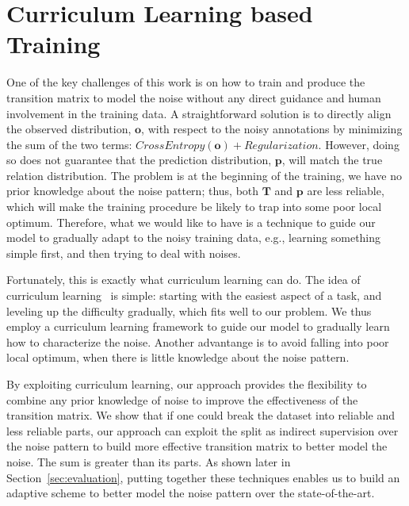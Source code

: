 \section{Curriculum Learning based Training \label{sec:training}}

One of the key challenges of this work is  on how to train and produce the transition matrix to model the noise without any direct guidance and human involvement in the training data.
A straightforward solution is to directly align the observed distribution, $\mathbf{o}$, with respect to the noisy annotations by minimizing the sum of the two terms:
$CrossEntropy(\mathbf{o}) + Regularization$. However, doing so
does not guarantee that the prediction distribution, $\mathbf{p}$, will match the true relation distribution.
The problem is at the beginning of the training, we have no prior knowledge about the noise pattern; thus, both  $\mathbf{T}$ and $\mathbf{p}$ are less reliable, which will make the training procedure be likely to trap into some poor local optimum.
Therefore, what we would like to have is a technique to guide our model to gradually adapt to the noisy training data, e.g., learning something simple first, and then trying to deal with noises.

Fortunately, this is exactly what curriculum learning can do.
The idea of curriculum learning~\cite{bengio2009curriculum} is simple: starting with the easiest aspect of a task, and leveling up the difficulty gradually,
which fits well to our problem.
We thus employ a curriculum
learning framework to guide our model to gradually learn how to characterize the noise. 
Another advantange is to avoid falling into poor local optimum,
when there is little knowledge about the noise pattern. 


By exploiting curriculum learning, our approach  provides the
flexibility to combine any prior knowledge of noise to improve the
effectiveness of  the transition matrix. 
We show that if one could break the
dataset into reliable and less reliable parts, our approach can exploit the split
as indirect supervision over the noise pattern to build more effective
transition matrix to better model the noise. The sum is greater than its parts.
As shown later in Section~\ref{sec:evaluation}, putting together these techniques
enables us to build an adaptive scheme to better model the noise pattern over the state-of-the-art.



